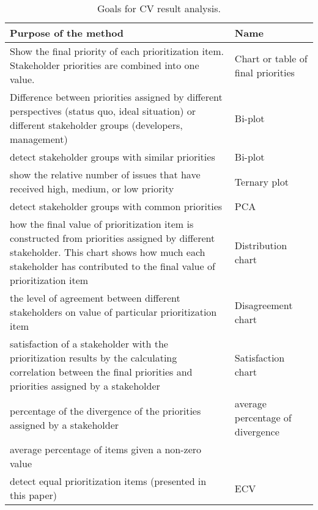 \begin{table}
	\scriptsize
\caption{Goals for CV result analysis.}
\label{goals_for_methods}

\begin{tabular}{|>{\raggedright}p{}|>{\raggedright}p{}|}
\hline 
Purpose of the method & Name\tabularnewline
\hline

Show the final priority of each prioritization item. Stakeholder priorities
are combined into one value. & 
Chart or table of final priorities\tabularnewline
\hline 

Difference between priorities assigned by different perspectives (status
quo, ideal situation) or different stakeholder groups (developers,
management) \citep{Chatzipetrou2010}& 
Bi-plot \tabularnewline
\hline 

detect stakeholder groups with similar priorities \citep{Chatzipetrou2010}& Bi-plot \tabularnewline
\hline 

show the relative number of issues that have received high, medium,
or low priority \citep{Chatzipetrou2010}& Ternary plot \tabularnewline
\hline 

detect stakeholder groups with common priorities \citep{Chatzipetrou2010}& PCA \tabularnewline
\hline 

how the final value of prioritization item is constructed from priorities
assigned by different stakeholder. This chart shows how much each
stakeholder has contributed to the final value of prioritization item \citep{Regnell2000}& Distribution chart  \tabularnewline
\hline 

the level of agreement between different stakeholders on value of
particular prioritization item \citep{Regnell2000} & 
Disagreement chart  \tabularnewline
\hline 

satisfaction of a stakeholder with the prioritization results by the
calculating correlation between the final priorities and priorities
assigned by a stakeholder \citep{Regnell2000}& 
Satisfaction chart\tabularnewline
\hline 

percentage of the divergence of the priorities assigned by a stakeholder \citep{Berander2006a} & 
average percentage of divergence\tabularnewline
\hline 
average percentage of items given a non-zero value \citep{Berander2006a} & \tabularnewline
\hline 

detect equal prioritization items (presented in this paper)& 
ECV \tabularnewline
\hline
\end{tabular}
\end{table}

